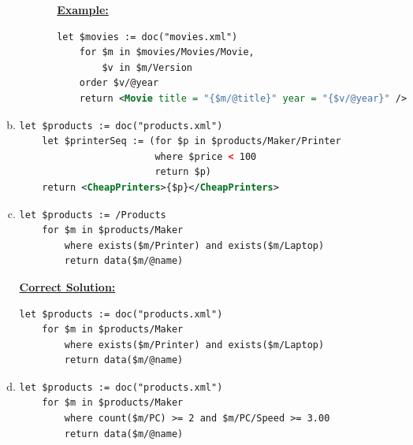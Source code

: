 \documentclass[12pt]{article}
\begin{document}
\begin{enumerate}[1.]
\begin{enumerate}[a)]
\begin{itemize}
\begin{itemize}
                \bigskip

                \underline{\textbf{Example:}}

    \begin{lstlisting}[language=XML]
    let $movies := doc("movies.xml")
    for $m in $movies/Movies/Movie,
        $v in $m/Version
    order $v/@year
    return <Movie title = "{$m/@title}" year = "{$v/@year}" />
    \end{lstlisting}
            \end{itemize}
        \end{itemize}

        \item

    \begin{lstlisting}[language=XML]
    let $products := doc("products.xml")
    let $printerSeq := (for $p in $products/Maker/Printer
                        where $price < 100
                        return $p)
    return <CheapPrinters>{$p}</CheapPrinters>
    \end{lstlisting}

        \item

    \begin{lstlisting}[language=XML]
    let $products := /Products
    for $m in $products/Maker
        where exists($m/Printer) and exists($m/Laptop)
        return data($m/@name)
    \end{lstlisting}

        \bigskip

    \begin{mdframed}
        \underline{\textbf{Correct Solution:}}

        \bigskip

    \begin{lstlisting}[language=XML]
    let $products := doc("products.xml")
    for $m in $products/Maker
        where exists($m/Printer) and exists($m/Laptop)
        return data($m/@name)
    \end{lstlisting}
    \end{mdframed}

        \item

    \begin{lstlisting}[language=XML]
    let $products := doc("products.xml")
    for $m in $products/Maker
        where count($m/PC) >= 2 and $m/PC/Speed >= 3.00
        return data($m/@name)
    \end{lstlisting}


\end{enumerate}
\end{enumerate}
\end{document}
